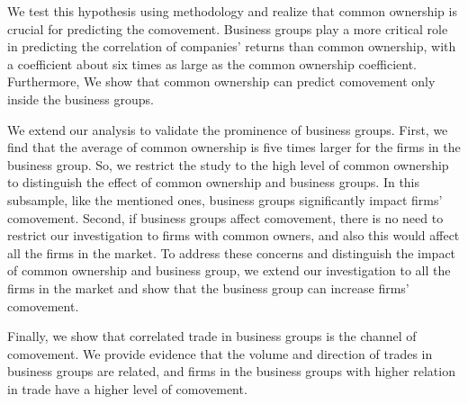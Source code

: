 We test this hypothesis using \cite{AntonPolk} methodology and realize that common ownership is crucial for predicting the comovement. Business groups play a more critical role in predicting the correlation of companies' returns than common ownership, with a coefficient about six times as large as the common ownership coefficient. Furthermore, We show that common ownership can predict comovement only inside the business groups.



We extend our analysis to validate the prominence of business groups. First, we find that the average of common ownership is five times larger for the firms in the business group. So, we restrict the study to the high level of common ownership to distinguish the effect of common ownership and business groups. In this subsample, like the mentioned ones, business groups significantly impact firms' comovement. Second, if business groups affect comovement, there is no need to restrict our investigation to firms with common owners, and also this would affect all the firms in the market. To address these concerns and distinguish the impact of common ownership and business group, we extend our investigation to all the firms in the market and show that the business group can increase firms' comovement. 
	
	Finally, we show that correlated trade in business groups is the channel of comovement. We provide evidence that the volume and direction of trades in business groups are related, and firms in the business groups with higher relation in trade have a higher level of comovement.
	
	
	

%